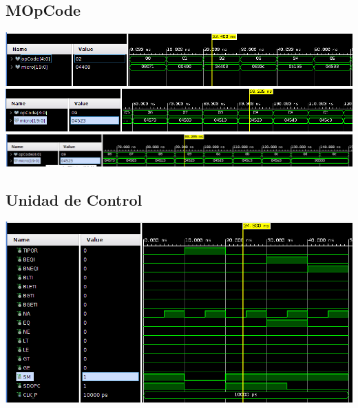 \documentclass[8pt,executivepaper]{article}
\begin{document}
\subsection{MOpCode}
\begin{center}
  \includegraphics[scale=0.5]{img/mopcode-1.png}\\
  \includegraphics[scale=0.43]{img/mopcode-2.png}\\
  \includegraphics[scale=0.43]{img/mopcode-3.png}
\end{center}
\subsection{Unidad de Control}
\begin{center}
  \includegraphics[scale=0.5]{img/unControl.png}
\end{center}
\end{document}
